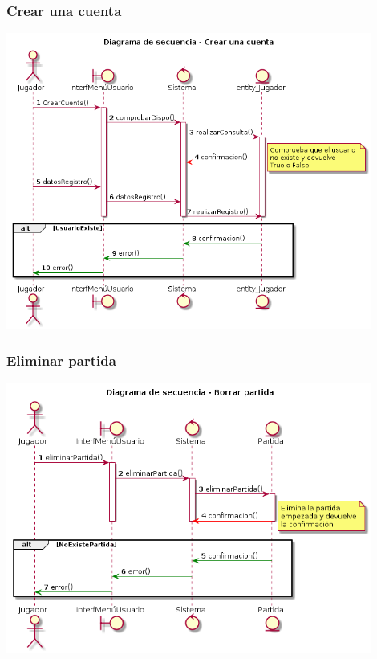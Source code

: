 \subsubsection{Crear una cuenta}
\begin{center}
  \includegraphics[width=0.9\textwidth]{./imatges/jugador/Crear_una_cuenta.png}
  \end{center}
  
\subsubsection{Eliminar partida}
\begin{center}
  \includegraphics[width=0.9\textwidth]{./imatges/jugador/Eliminar_partida.png}
  \end{center}

